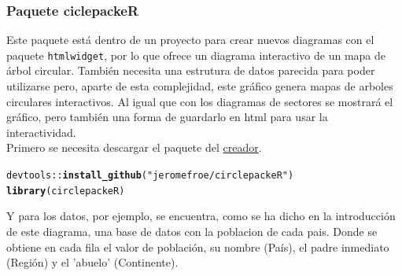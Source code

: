 \documentclass{article}\usepackage[]{graphicx}\usepackage[]{color}
\makeatletter
\newcommand{\hlstr}[1]{\textcolor[rgb]{0.192,0.494,0.8}{#1}}%
\newcommand{\hlopt}[1]{\textcolor[rgb]{0,0,0}{#1}}%
\newcommand{\hlstd}[1]{\textcolor[rgb]{0.345,0.345,0.345}{#1}}%
\newcommand{\hlkwd}[1]{\textcolor[rgb]{0.737,0.353,0.396}{\textbf{#1}}}%
\newenvironment{kframe}{%
 \def\at@end@of@kframe{}%
 \ifinner\ifhmode%
  \def\at@end@of@kframe{\end{minipage}}%
  \begin{minipage}{\columnwidth}%
 \fi\fi%
 \def\FrameCommand##1{\hskip\@totalleftmargin \hskip-\fboxsep
 \colorbox{shadecolor}{##1}\hskip-\fboxsep
     \hskip-\linewidth \hskip-\@totalleftmargin \hskip\columnwidth}%
 \MakeFramed {\advance\hsize-\width
   \@totalleftmargin\z@ \linewidth\hsize
   \@setminipage}}%
 {\par\unskip\endMakeFramed%
 \at@end@of@kframe}
\newenvironment{knitrout}{}{} %
\makeatother
\begin{document}
\subsubsection{Paquete ciclepackeR}
Este paquete\cite{docu_circlepacker} est\'a dentro de un proyecto para crear nuevos diagramas con el paquete \texttt{htmlwidget}\cite{docu_htmlwidget}, por lo que ofrece un diagrama interactivo de un mapa de \'arbol circular. Tambi\'en necesita una estrutura de datos parecida para poder utilizarse pero, aparte de esta complejidad, este gr\'afico genera mapas de arboles circulares interactivos. Al igual que con los diagramas de sectores se mostrar\'a el gr\'afico, pero tambi\'en una forma de guardarlo en html para usar la interactividad.~\\
Primero se necesita descargar el paquete del \href{https://github.com/jeromefroe/circlepackeR}{creador}.
\begin{knitrout}
\color{fgcolor}\begin{kframe}
\begin{alltt}
\hlstd{devtools}\hlopt{::}\hlkwd{install_github}\hlstd{(}\hlstr{"jeromefroe/circlepackeR"}\hlstd{)}
\hlkwd{library}\hlstd{(circlepackeR)}
\end{alltt}
\end{kframe}
\end{knitrout}

Y para los datos, por ejemplo, se encuentra, como se ha dicho en la introducci\'on de este diagrama, una base de datos con la poblacion de cada pais. Donde se obtiene en cada fila el valor de poblaci\'on, su nombre (Pa\'is), el padre inmediato (Regi\'on) y el 'abuelo' (Continente).
\end{document}
